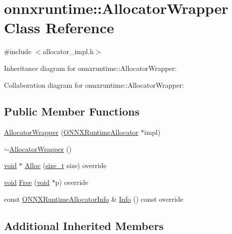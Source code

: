 \hypertarget{classonnxruntime_1_1AllocatorWrapper}{}\section{onnxruntime\+:\+:Allocator\+Wrapper Class Reference}
\label{classonnxruntime_1_1AllocatorWrapper}


{\ttfamily \#include $<$allocator\+\_\+impl.\+h$>$}



Inheritance diagram for onnxruntime\+:\+:Allocator\+Wrapper\+:


Collaboration diagram for onnxruntime\+:\+:Allocator\+Wrapper\+:
\subsection*{Public Member Functions}
\begin{DoxyCompactItemize}
\item 
\mbox{\hyperlink{classonnxruntime_1_1AllocatorWrapper_a71d3cd16e3c96db9d9b558264e3b0d38}{Allocator\+Wrapper}} (\mbox{\hyperlink{session_2allocator_8h_a9eb4a70849a17d41aca1955b07cdfaca}{O\+N\+N\+X\+Runtime\+Allocator}} $\ast$impl)
\item 
\mbox{\hyperlink{classonnxruntime_1_1AllocatorWrapper_a32e99efeb7d7f2b5abae3b5422f62417}{$\sim$\+Allocator\+Wrapper}} ()
\item 
\mbox{\hyperlink{mlasi_8h_a88f941d423cb2a819b70a1358982b1a6}{void}} $\ast$ \mbox{\hyperlink{classonnxruntime_1_1AllocatorWrapper_aee649143cd3134b3b838fd81cfe2f457}{Alloc}} (\mbox{\hyperlink{mlasi_8h_a503efbc1c6e50825320ad909366b78ab}{size\+\_\+t}} size) override
\item 
\mbox{\hyperlink{mlasi_8h_a88f941d423cb2a819b70a1358982b1a6}{void}} \mbox{\hyperlink{classonnxruntime_1_1AllocatorWrapper_ac41adbaba7d92b14697b271050d0cab2}{Free}} (\mbox{\hyperlink{mlasi_8h_a88f941d423cb2a819b70a1358982b1a6}{void}} $\ast$p) override
\item 
const \mbox{\hyperlink{structONNXRuntimeAllocatorInfo}{O\+N\+N\+X\+Runtime\+Allocator\+Info}} \& \mbox{\hyperlink{classonnxruntime_1_1AllocatorWrapper_a4eca2bcda00b9c970c3e8fd610d8f7b0}{Info}} () const override
\end{DoxyCompactItemize}
\subsection*{Additional Inherited Members}



